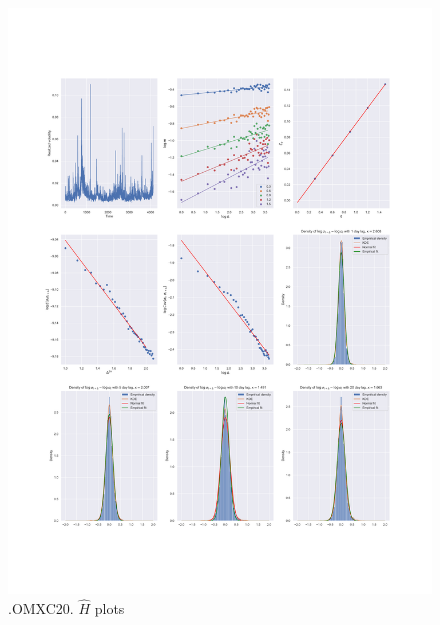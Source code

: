 	\begin{figure}[h]
		\centering
		\includegraphics[width=\linewidth]{fig/.OMXC20.pdf}
		\caption{.OMXC20. $\hat{H}$ plots}
	\end{figure}

